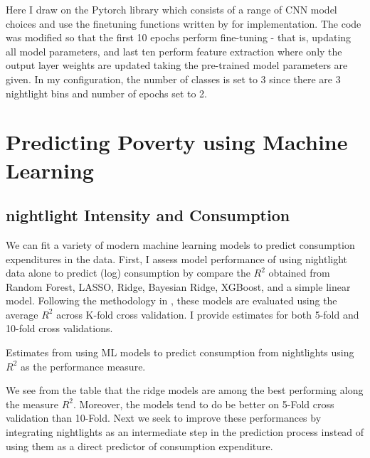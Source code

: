 \documentclass[11pt, a4paper, leqno]{article}
\begin{document}
\noindent Here I draw on the Pytorch library which consists of a range of CNN model choices and use the finetuning functions written by \citet{pytut} for implementation. The code was modified so that the first 10 epochs perform fine-tuning - that is, updating all model parameters, and last ten perform feature extraction where only the output layer weights are updated taking the pre-trained model parameters are given. In my configuration, the number of classes is set to 3 since there are 3 nightlight bins and number of epochs set to 2.

\section{Predicting Poverty using Machine Learning }

\subsection{nightlight Intensity and Consumption}

\noindent We can fit a variety of modern machine learning models to predict consumption expenditures in the data. First, I assess model performance of using nightlight data alone to predict (log) consumption by compare the $R^2$ obtained from Random Forest, LASSO, Ridge, Bayesian Ridge, XGBoost, and a simple linear model. Following the methodology in \citet{jean2016combining}, these models are evaluated using the average $R^2$ across K-fold cross validation. I provide estimates for both 5-fold and 10-fold cross validations.

\begin{table}[H]
\centering
    \scalebox{1.1}{}
\caption{Estimates from using ML models to predict consumption from nightlights using $R^2$ as the performance measure.}
\end{table}

\noindent We see from the table that the ridge models are among the best performing along the measure $R^2$.  Moreover, the models tend to do be better on 5-Fold cross validation than 10-Fold. Next we seek to improve these performances by integrating nightlights as an intermediate step in the prediction process instead of using them as a direct predictor of consumption expenditure. 
\end{document}
